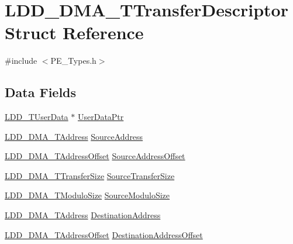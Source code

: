 \hypertarget{struct_l_d_d___d_m_a___t_transfer_descriptor}{}\section{L\+D\+D\+\_\+\+D\+M\+A\+\_\+\+T\+Transfer\+Descriptor Struct Reference}
\label{struct_l_d_d___d_m_a___t_transfer_descriptor}


{\ttfamily \#include $<$P\+E\+\_\+\+Types.\+h$>$}

\subsection*{Data Fields}
\begin{DoxyCompactItemize}
\item 
\hyperlink{group___p_e___types__module_ga0b66a73f87238a782318aa0be7578e35}{L\+D\+D\+\_\+\+T\+User\+Data} $\ast$ \hyperlink{struct_l_d_d___d_m_a___t_transfer_descriptor_a4136d6742944c7b04a94695c78b581b8}{User\+Data\+Ptr}
\item 
\hyperlink{group___p_e___types__module_gab8287f62db7ff96992355760b652cd07}{L\+D\+D\+\_\+\+D\+M\+A\+\_\+\+T\+Address} \hyperlink{struct_l_d_d___d_m_a___t_transfer_descriptor_a1f204488d1a8b0c542fb7523f604b5e3}{Source\+Address}
\item 
\hyperlink{group___p_e___types__module_ga3e4ae49348fdee472624efd76ed25476}{L\+D\+D\+\_\+\+D\+M\+A\+\_\+\+T\+Address\+Offset} \hyperlink{struct_l_d_d___d_m_a___t_transfer_descriptor_a0d0dd8d0a0787d92dbd55c796b07132d}{Source\+Address\+Offset}
\item 
\hyperlink{group___p_e___types__module_ga868f08f9448e5df27a38314f0893d84a}{L\+D\+D\+\_\+\+D\+M\+A\+\_\+\+T\+Transfer\+Size} \hyperlink{struct_l_d_d___d_m_a___t_transfer_descriptor_a96068433ffe065c3fa85f7d2f9a9b545}{Source\+Transfer\+Size}
\item 
\hyperlink{group___p_e___types__module_gacf2f2d4310e7634351c68e1f64a4c483}{L\+D\+D\+\_\+\+D\+M\+A\+\_\+\+T\+Modulo\+Size} \hyperlink{struct_l_d_d___d_m_a___t_transfer_descriptor_a65316d477535d064953174d3eb7eadfe}{Source\+Modulo\+Size}
\item 
\hyperlink{group___p_e___types__module_gab8287f62db7ff96992355760b652cd07}{L\+D\+D\+\_\+\+D\+M\+A\+\_\+\+T\+Address} \hyperlink{struct_l_d_d___d_m_a___t_transfer_descriptor_a36982f9f85fdeab04f7942d173f9bcb7}{Destination\+Address}
\item 
\hyperlink{group___p_e___types__module_ga3e4ae49348fdee472624efd76ed25476}{L\+D\+D\+\_\+\+D\+M\+A\+\_\+\+T\+Address\+Offset} \hyperlink{struct_l_d_d___d_m_a___t_transfer_descriptor_a69841fc4c2477b04b3371594dea2f47c}{Destination\+Address\+Offset}

\end{DoxyCompactItemize}
